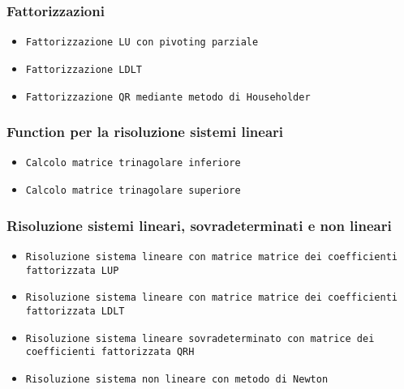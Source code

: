 \label{functcap3}
\begin{flushleft}
\subsubsection{Fattorizzazioni}
\begin{itemize}
    \item \texttt{Fattorizzazione LU con pivoting parziale}

    \item \texttt{Fattorizzazione LDLT}

    \item \texttt{Fattorizzazione QR mediante metodo di Householder}

\end{itemize}
\subsubsection{Function per la risoluzione sistemi lineari}
\begin{itemize}
    \item \texttt{Calcolo matrice trinagolare inferiore}

    \item \texttt{Calcolo matrice trinagolare superiore}

\end{itemize}
\subsubsection{Risoluzione sistemi lineari, sovradeterminati e non lineari}
\begin{itemize}
    \item \texttt{Risoluzione sistema lineare con matrice matrice dei coefficienti fattorizzata LUP}

    \item \texttt{Risoluzione sistema lineare con matrice matrice dei coefficienti fattorizzata LDLT}

    \item \texttt{Risoluzione sistema lineare sovradeterminato con matrice dei coefficienti fattorizzata QRH}

    \item \texttt{Risoluzione sistema non lineare con metodo di Newton}

\end{itemize}
\end{flushleft}